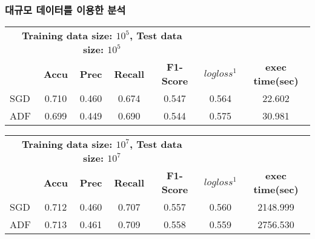 \documentclass{beamer}
\begin{document}

\begin{frame}
\frametitle{대규모 데이터를 이용한 분석}






{\scriptsize
	\begin{center}%
	\begin{tabular}{ccccccc}
	\hline\hline %

    \multicolumn{5}{c}{\textbf{Training data size: $10^5$, Test data size: $10^5$}} & \textbf{} & \textbf{} \\

	\textbf{} & \textbf{Accu} & \textbf{Prec} & \textbf{Recall} & \textbf{F1-Score} & \textbf{$logloss^1$} & \textbf{exec time(sec)} \\

	\hline %
	
	\multicolumn {1}{l|}{SGD} & 0.710 & 0.460 & 0.674 & 0.547 & 0.564 & 22.602 \\ \hline
	\multicolumn {1}{l|}{ADF} & 0.699 & 0.449 & 0.690 & 0.544 & 0.575 & 30.981 \\ \hline

	\hline %
	\end{tabular}
    \end{center}
}



{\scriptsize
	\begin{center}%
	\begin{tabular}{ccccccc}
	\hline\hline %

    \multicolumn{5}{c}{\textbf{Training data size: $10^7$, Test data size: $10^7$}} & \textbf{} & \textbf{} \\

	\textbf{} & \textbf{Accu} & \textbf{Prec} & \textbf{Recall} & \textbf{F1-Score} & \textbf{$logloss^1$} & \textbf{exec time(sec)} \\

	\hline %
	
	\multicolumn {1}{l|}{SGD} & 0.712 & 0.460 & 0.707 & 0.557 & 0.560 & 2148.999 \\ \hline
	\multicolumn {1}{l|}{ADF} & 0.713 & 0.461 & 0.709 & 0.558 & 0.559 & 2756.530 \\ \hline


\end{tabular}
\end{center}}
\end{frame}
\end{document}
